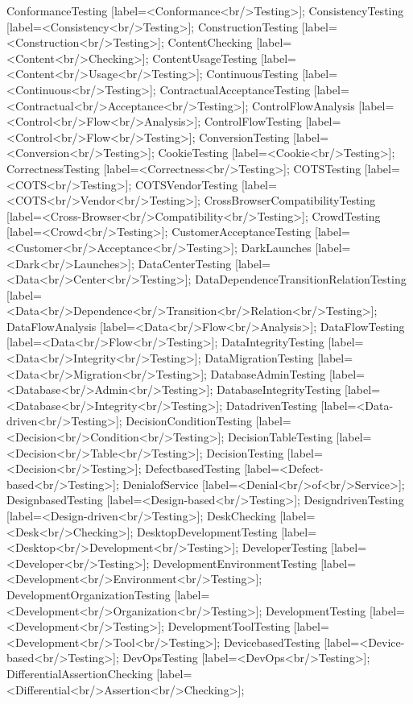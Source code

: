 \documentclass{article}
\begin{document}
{ConformanceTesting [label=<Conformance<br/>Testing>];
ConsistencyTesting [label=<Consistency<br/>Testing>];
ConstructionTesting [label=<Construction<br/>Testing>];
ContentChecking [label=<Content<br/>Checking>];
ContentUsageTesting [label=<Content<br/>Usage<br/>Testing>];
ContinuousTesting [label=<Continuous<br/>Testing>];
ContractualAcceptanceTesting [label=<Contractual<br/>Acceptance<br/>Testing>];
ControlFlowAnalysis [label=<Control<br/>Flow<br/>Analysis>];
ControlFlowTesting [label=<Control<br/>Flow<br/>Testing>];
ConversionTesting [label=<Conversion<br/>Testing>];
CookieTesting [label=<Cookie<br/>Testing>];
CorrectnessTesting [label=<Correctness<br/>Testing>];
COTSTesting [label=<COTS<br/>Testing>];
COTSVendorTesting [label=<COTS<br/>Vendor<br/>Testing>];
CrossBrowserCompatibilityTesting [label=<Cross-Browser<br/>Compatibility<br/>Testing>];
CrowdTesting [label=<Crowd<br/>Testing>];
CustomerAcceptanceTesting [label=<Customer<br/>Acceptance<br/>Testing>];
DarkLaunches [label=<Dark<br/>Launches>];
DataCenterTesting [label=<Data<br/>Center<br/>Testing>];
DataDependenceTransitionRelationTesting [label=<Data<br/>Dependence<br/>Transition<br/>Relation<br/>Testing>];
DataFlowAnalysis [label=<Data<br/>Flow<br/>Analysis>];
DataFlowTesting [label=<Data<br/>Flow<br/>Testing>];
DataIntegrityTesting [label=<Data<br/>Integrity<br/>Testing>];
DataMigrationTesting [label=<Data<br/>Migration<br/>Testing>];
DatabaseAdminTesting [label=<Database<br/>Admin<br/>Testing>];
DatabaseIntegrityTesting [label=<Database<br/>Integrity<br/>Testing>];
DatadrivenTesting [label=<Data-driven<br/>Testing>];
DecisionConditionTesting [label=<Decision<br/>Condition<br/>Testing>];
DecisionTableTesting [label=<Decision<br/>Table<br/>Testing>];
DecisionTesting [label=<Decision<br/>Testing>];
DefectbasedTesting [label=<Defect-based<br/>Testing>];
DenialofService [label=<Denial<br/>of<br/>Service>];
DesignbasedTesting [label=<Design-based<br/>Testing>];
DesigndrivenTesting [label=<Design-driven<br/>Testing>];
DeskChecking [label=<Desk<br/>Checking>];
DesktopDevelopmentTesting [label=<Desktop<br/>Development<br/>Testing>];
DeveloperTesting [label=<Developer<br/>Testing>];
DevelopmentEnvironmentTesting [label=<Development<br/>Environment<br/>Testing>];
DevelopmentOrganizationTesting [label=<Development<br/>Organization<br/>Testing>];
DevelopmentTesting [label=<Development<br/>Testing>];
DevelopmentToolTesting [label=<Development<br/>Tool<br/>Testing>];
DevicebasedTesting [label=<Device-based<br/>Testing>];
DevOpsTesting [label=<DevOps<br/>Testing>];
DifferentialAssertionChecking [label=<Differential<br/>Assertion<br/>Checking>];
}
\end{document}
